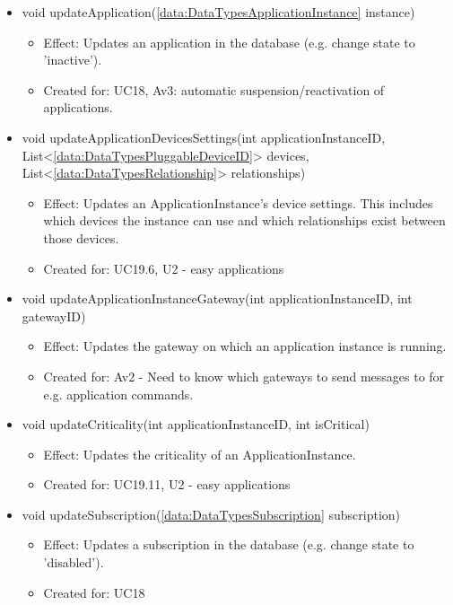 \begin{description}
\begin{itemize}[noitemsep,nolistsep,leftmargin=-.25cm]
\begin{itemize}
        \end{itemize}
      \item \textsf{void updateApplication(\ref{data:DataTypesApplicationInstance} instance)}
        \begin{itemize}[noitemsep,nolistsep]
           \item Effect: Updates an application in the database (e.g. change state to 'inactive').
\item Created for: UC18, Av3: automatic suspension/reactivation of applications.
        \end{itemize}
      \item \textsf{void updateApplicationDevicesSettings(int applicationInstanceID, List\textless{}\ref{data:DataTypesPluggableDeviceID}\textgreater{} devices, List\textless{}\ref{data:DataTypesRelationship}\textgreater{} relationships)}
        \begin{itemize}[noitemsep,nolistsep]
           \item Effect: Updates an ApplicationInstance's device settings. This includes which devices the instance can use and which relationships exist between those devices.
\item Created for: UC19.6, U2 - easy applications
        \end{itemize}
      \item \textsf{void updateApplicationInstanceGateway(int applicationInstanceID, int gatewayID)}
        \begin{itemize}[noitemsep,nolistsep]
           \item Effect: Updates the gateway on which an application instance is running.
\item Created for: Av2 - Need to know which gateways to send messages to for e.g. application commands.
        \end{itemize}
      \item \textsf{void updateCriticality(int applicationInstanceID, int isCritical)}
        \begin{itemize}[noitemsep,nolistsep]
           \item Effect: Updates the criticality of an ApplicationInstance.
\item Created for: UC19.11, U2 - easy applications
        \end{itemize}
      \item \textsf{void updateSubscription(\ref{data:DataTypesSubscription} subscription)}
        \begin{itemize}[noitemsep,nolistsep]
           \item Effect: Updates a subscription in the database (e.g. change state to 'disabled').
\item Created for: UC18
        \end{itemize}
    \end{itemize}
    \end{description}

